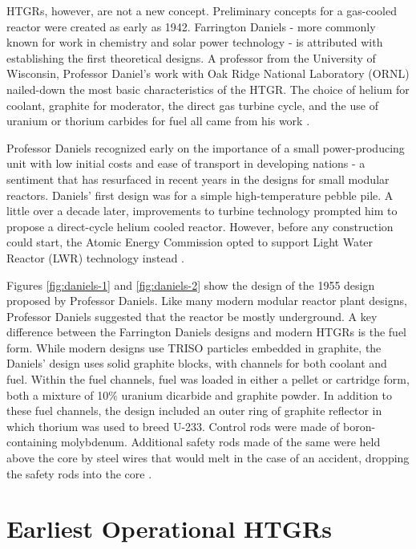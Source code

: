 HTGRs, however, are not a new concept.  Preliminary concepts for a gas-cooled reactor were created as early as 1942.  Farrington Daniels - more commonly known for work in chemistry and solar power technology - is attributed with establishing the first theoretical designs.  A professor from the University of Wisconsin, Professor Daniel's work with Oak Ridge National Laboratory (ORNL) nailed-down the most basic characteristics of the HTGR.  The choice of helium for coolant, graphite for moderator, the direct gas turbine cycle, and the use of uranium or thorium carbides for fuel all came from his work \cite{simnad_early_1991}.

Professor Daniels recognized early on the importance of a small power-producing unit with low initial costs and ease of transport in developing nations - a sentiment that has resurfaced in recent years in the designs for small modular reactors.  Daniels' first design was for a simple high-temperature pebble pile.  A little over a decade later, improvements to turbine technology prompted him to propose a direct-cycle helium cooled reactor.  However, before any construction could start, the Atomic Energy Commission opted to support Light Water Reactor (LWR) technology instead \cite{simnad_early_1991}.




Figures \ref{fig:daniels-1} and \ref{fig:daniels-2} show the design of the 1955 design proposed by Professor Daniels.  Like many modern modular reactor plant designs, Professor Daniels suggested that the reactor be mostly underground.  A key difference between the Farrington Daniels designs and modern HTGRs is the fuel form.  While modern designs use TRISO particles embedded in graphite, the Daniels' design uses solid graphite blocks, with channels for both coolant and fuel.  Within the fuel channels, fuel was loaded in either a pellet or cartridge form, both a mixture of 10$\%$ uranium dicarbide and graphite powder.  In addition to these fuel channels, the design included an outer ring of graphite reflector in which thorium was used to breed U-233.  Control rods were made of boron-containing molybdenum.  Additional safety rods made of the same were held above the core by steel wires that would melt in the case of an accident, dropping the safety rods into the core \cite{simnad_early_1991}.

\section{Earliest Operational HTGRs}

